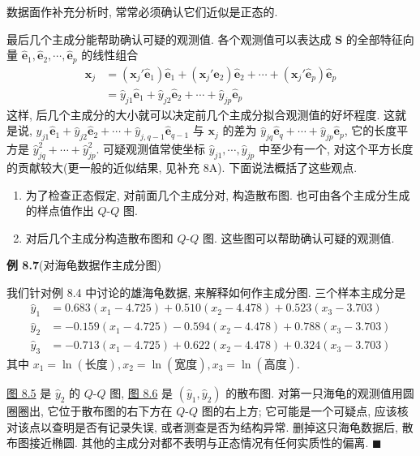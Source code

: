 
数据面作补充分析时, 常常必须确认它们近似是正态的.

最后几个主成分能帮助确认可疑的观测值. 各个观测值可以表达成 $\mathbf{S}$ 的全部特征向量 $\hat{\mathbf{e}}_1,\hat{\mathbf{e}}_2,\cdots,\hat{\mathbf{e}}_p$ 的线性组合
\[
\begin{aligned}
\mathbf{x}_j&=(\mathbf{x}_j'\hat{\mathbf{e}}_1)\hat{\mathbf{e}}_1+(\mathbf{x}_j'\hat{\mathbf{e}}_2)\hat{\mathbf{e}}_2+\cdots+(\mathbf{x}_j'\hat{\mathbf{e}}_p)\hat{\mathbf{e}}_p\\
&=\hat{y}_{j1}\hat{\mathbf{e}}_1+\hat{y}_{j2}\hat{\mathbf{e}}_2+\cdots+\hat{y}_{jp}\hat{\mathbf{e}}_p
\end{aligned}
\]
这样, 后几个主成分的大小就可以决定前几个主成分拟合观测值的好坏程度. 这就是说, $\hat{y}_{j1}\hat{\mathbf{e}}_1+\hat{y}_{j2}\hat{\mathbf{e}}_2+\cdots+\hat{y}_{j,q-1}\hat{\mathbf{e}}_{q-1}$ 与 $\mathbf{x}_j$ 的差为 $\hat{y}_{jq}\hat{\mathbf{e}}_q+\cdots+\hat{y}_{jp}\hat{\mathbf{e}}_p$, 它的长度平方是 $\hat{y}_{jq}^2+\cdots+\hat{y}_{jp}^2$. 可疑观测值常使坐标 $\hat{y}_{j1},\cdots,\hat{y}_{jp}$ 中至少有一个, 对这个平方长度的贡献较大(更一般的近似结果, 见补充 8A). 下面说法概括了这些观点.

\begin{enumerate}[label=\arabic*.,leftmargin=2em,itemsep=2pt]
\item 为了检查正态假定, 对前面几个主成分对, 构造散布图. 也可由各个主成分生成的样点值作出 $Q$-$Q$ 图.
\item 对后几个主成分构造散布图和 $Q$-$Q$ 图. 这些图可以帮助确认可疑的观测值.
\end{enumerate}

\noindent\textbf{例 8.7}\quad (对海龟数据作主成分图)

我们针对例 8.4 中讨论的雄海龟数据, 来解释如何作主成分图. 三个样本主成分是
\[
\begin{aligned}
\hat{y}_1&=0.683(x_1-4.725)+0.510(x_2-4.478)+0.523(x_3-3.703)\\
\hat{y}_2&=-0.159(x_1-4.725)-0.594(x_2-4.478)+0.788(x_3-3.703)\\
\hat{y}_3&=-0.713(x_1-4.725)+0.622(x_2-4.478)+0.324(x_3-3.703)
\end{aligned}
\]
其中 $x_1=\ln(\text{长度}), x_2=\ln(\text{宽度}), x_3=\ln(\text{高度})$.

\hyperref[fig:8.5]{图 8.5} 是 $\hat{y}_2$ 的 $Q$-$Q$ 图, \hyperref[fig:8.6]{图 8.6} 是 $(\hat{y}_1,\hat{y}_2)$ 的散布图. 对第一只海龟的观测值用圆圈圈出, 它位于散布图的右下方在 $Q$-$Q$ 图的右上方; 它可能是一个可疑点, 应该核对该点以查明是否有记录失误, 或者测查是否为结构异常. 删掉这只海龟数据后, 散布图接近椭圆. 其他的主成分对都不表明与正态情况有任何实质性的偏离. \hfill$\blacksquare$

